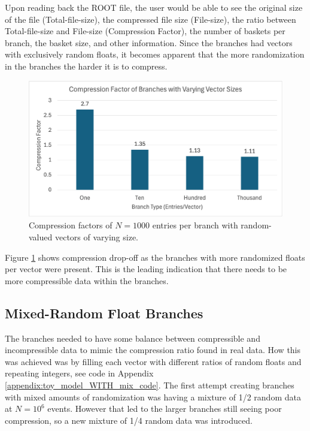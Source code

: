 Upon reading back the ROOT file, the user would be able to see the original size of the file (Total-file-size), the compressed file size (File-size), the ratio between Total-file-size and File-size (Compression Factor), the number of baskets per branch, the basket size, and other information. 
Since the branches had vectors with exclusively random floats, it becomes apparent that the more randomization in the branches the harder it is to compress. 

\begin{figure}[h]
    \caption{Compression factors of $N=1000$ entries per branch with random-valued vectors of varying size.}
    \label{fig:toymodel_compF_rndm_vectors}
    \centering
    \includegraphics[width=.8\textwidth]{content/toymodel_content/branch_compfacts_nomix.png}
\end{figure}


Figure \ref{fig:toymodel_compF_rndm_vectors} shows compression drop-off as the branches with more randomized floats per vector were present.
This is the leading indication that there needs to be more compressible data within the branches. 

\subsection{Mixed-Random Float Branches}
The branches needed to have some balance between compressible and incompressible data to mimic the compression ratio found in real data.
How this was achieved was by filling each vector with different ratios of random floats and repeating integers, see code in Appendix \ref{appendix:toy_model_WITH_mix_code}.
The first attempt creating branches with mixed amounts of randomization was having a mixture of 1/2 random data at $N=10^6$ events. 
However that led to the larger branches still seeing poor compression, so a new mixture of 1/4 random data was introduced. 

